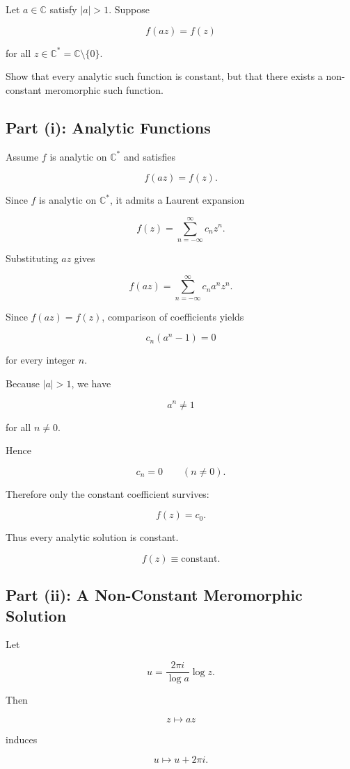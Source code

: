 \documentclass[12pt,a4paper]{article}
\theoremstyle{notespace}
\begin{document}
Let \(a\in\mathbb C\) satisfy \(|a|>1\). Suppose

\[
f(az)=f(z)
\]

for all \(z\in\mathbb C^*=\mathbb C\setminus\{0\}\).

Show that every analytic such function is constant, but that there exists a non-constant meromorphic such function.

\subsection{Part (i): Analytic Functions}

Assume \(f\) is analytic on \(\mathbb C^*\) and satisfies

\[
f(az)=f(z).
\]

Since \(f\) is analytic on \(\mathbb C^*\), it admits a Laurent expansion

\[
f(z)=\sum_{n=-\infty}^{\infty} c_n z^n.
\]

Substituting \(az\) gives

\[
f(az)
=
\sum_{n=-\infty}^{\infty}
c_n a^n z^n.
\]

Since \(f(az)=f(z)\), comparison of coefficients yields

\[
c_n(a^n-1)=0
\]

for every integer \(n\).

Because \(|a|>1\), we have

\[
a^n\neq 1
\]

for all \(n\neq 0\).

Hence

\[
c_n=0
\qquad (n\neq 0).
\]

Therefore only the constant coefficient survives:

\[
f(z)=c_0.
\]

Thus every analytic solution is constant.

\[
\boxed{
	f(z)\equiv \text{constant}.
}
\]

\subsection{Part (ii): A Non-Constant Meromorphic Solution}

Let

\[
u=
\frac{2\pi i}{\log a}\log z.
\]

Then

\[
z\mapsto az
\]

induces

\[
u\mapsto u+2\pi i.
\]
\end{document}

